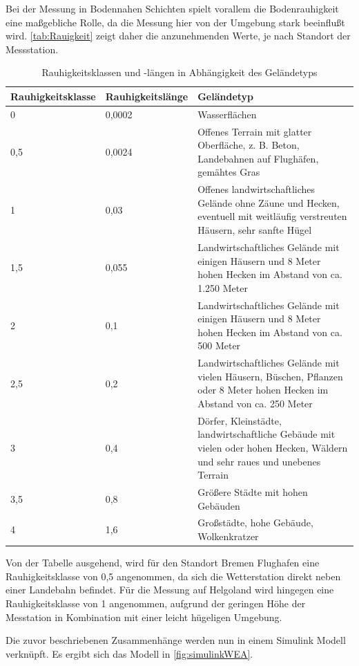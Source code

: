 Bei der Messung in Bodennahen Schichten spielt vorallem die Bodenrauhigkeit eine maßgebliche Rolle, da die Messung hier von der Umgebung stark beeinflußt wird. \autoref{tab:Rauigkeit} zeigt daher die anzunehmenden Werte, je nach Standort der Messstation.  

\begin{table} [H]
	\begin{tabular}[htpb]{p{4cm}|p{3cm}|p{7cm}}
		\textbf{Rauhigkeitsklasse} & \textbf{Rauhigkeitslänge} & \textbf{Geländetyp} \\
		\hline
		0 & 0,0002 & Wasserflächen \\
		\hline
		0,5 & 0,0024 & Offenes Terrain mit glatter Oberfläche, z. B. Beton, Landebahnen auf Flughäfen, gemähtes Gras \\
		\hline
		1 & 0,03 & Offenes landwirtschaftliches Gelände ohne Zäune und Hecken, eventuell mit weitläufig verstreuten Häusern, sehr sanfte Hügel \\
		\hline
		1,5 & 0,055 & Landwirtschaftliches Gelände mit einigen Häusern und 8 Meter hohen Hecken im Abstand von ca. 1.250 Meter \\
		\hline
		2 & 0,1 & Landwirtschaftliches Gelände mit einigen Häusern und 8 Meter hohen Hecken im Abstand von ca. 500 Meter \\
		\hline
		2,5 & 0,2 & Landwirtschaftliches Gelände mit vielen Häusern, Büschen, Pflanzen oder 8 Meter hohen Hecken im Abstand von ca. 250 Meter \\
		\hline
		3 & 0,4 & Dörfer, Kleinstädte, landwirtschaftliche Gebäude mit vielen oder hohen Hecken, Wäldern und sehr raues und unebenes Terrain \\
		\hline
		3,5 & 0,8 & Größere Städte mit hohen Gebäuden \\
		\hline
		4 & 1,6 & Großstädte, hohe Gebäude, Wolkenkratzer \\
	\end{tabular}
\centering
\caption{Rauhigkeitsklassen und -längen in Abhängigkeit des Geländetyps \cite{Rauigkeit}}
\label{tab:Rauigkeit}
\end{table}

Von der Tabelle ausgehend, wird für den Standort Bremen Flughafen eine Rauhigkeitsklasse von 0,5 angenommen, da sich die Wetterstation direkt neben einer Landebahn befindet. Für die Messung auf Helgoland wird hingegen eine Rauhigkeitsklasse von 1 angenommen, aufgrund der geringen Höhe der Messtation in Kombination mit einer leicht hügeligen Umgebung.

Die zuvor beschriebenen Zusammenhänge werden nun in einem Simulink Modell verknüpft. Es ergibt sich das Modell in \autoref{fig:simulinkWEA}.

